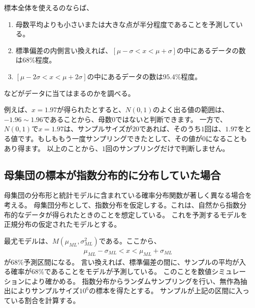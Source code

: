 標本全体を使えるのならば、
\begin{enumerate}
    \item 母数平均よりも小さいまたは大きな点が半分程度であることを予測している。
    \item 標準偏差の内側言い換えれば、$[\mu-\sigma<x<\mu+\sigma]$の中にあるデータの数は$68\%$程度。
    \item $[\mu-2\sigma < x < \mu+2\sigma]$の中にあるデータの数は$95.4\%$程度。
\end{enumerate}
などがデータに当てはまるのかを調べる。




例えば、$x=1.97$が得られたとすると、$N(0,1)$のよく出る値の範囲は、$-1.96\sim1.96$であることから、母数$0$ではないと判断できます。
一方で、$N(0,1)$で$x=1.97$は、サンプルサイズが$20$であれば、そのうち$1$回は、$1.97$をとる値です。もしももう一度サンプリングできたとして、その値が$0$になることもあり得ます。
以上のことから、$1$回のサンプリングだけで判断しません。
\fi

\subsection{母集団の標本が指数分布的に分布していた場合}
母集団の分布形と統計モデルに含まれている確率分布関数が著しく異なる場合を考える。
母集団分布として、指数分布を仮定しする。これは、自然から指数分布的なデータが得られたときのことを想定している。
これを予測するモデルを正規分布の仮定されたモデルとする。

最尤モデルは、$M(\mu_{ML},\sigma^2_{ML})$である。ここから、
\begin{eqnarray*}
    \mu_{ML}-\sigma_{ML} < x < \mu_{ML}+\sigma_{ML}
\end{eqnarray*}
が$68\%$予測区間になる。
言い換えれば、標準偏差の間に、サンプルの平均が入る確率が$68\%$であることをモデルが予測している。
このことを数値シミュレーションにより確かめる。
指数分布からランダムサンプリングを行い、無作為抽出によりサンプルサイズ$10^6$の標本を得たとする。
サンプルが上記の区間に入っている割合を計算する。

